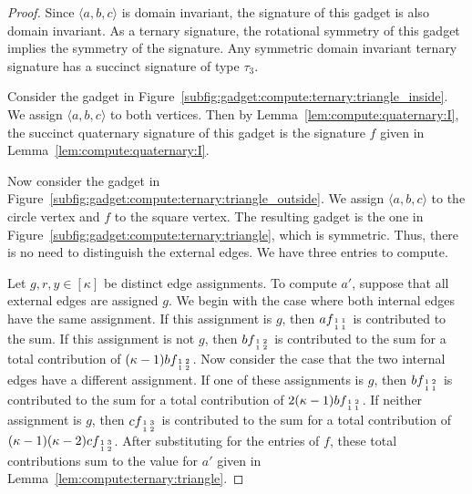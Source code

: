 \documentclass[11pt]{article}
\newcommand{\subMat}[4]{\mbox{\scriptsize $\begin{smallmatrix} #1 & #4 \\ #2 & #3 \end{smallmatrix}$}}
\begin{document}
\begin{proof}
 Since $\langle a,b,c \rangle$ is domain invariant,
 the signature of this gadget is also domain invariant.
 As a ternary signature,
 the rotational symmetry of this gadget implies the symmetry of the signature.
 Any symmetric domain invariant ternary signature has a succinct signature of type $\tau_3$.
 
 Consider the gadget in Figure~\ref{subfig:gadget:compute:ternary:triangle_inside}.
 We assign $\langle a,b,c \rangle$ to both vertices.
 Then by Lemma~\ref{lem:compute:quaternary:I},
 the succinct quaternary signature of this gadget is the signature $f$ given in Lemma~\ref{lem:compute:quaternary:I}.

 Now consider the gadget in Figure~\ref{subfig:gadget:compute:ternary:triangle_outside}.
 We assign $\langle a,b,c \rangle$ to the circle vertex and $f$ to the square vertex.
 The resulting gadget is the one in Figure~\ref{subfig:gadget:compute:ternary:triangle},
 which is symmetric.
 Thus, there is no need to distinguish the external edges.
 We have three entries to compute.
 
 Let $g,r,y \in [\kappa]$ be distinct edge assignments.
 To compute $a'$,
 suppose that all external edges are assigned $g$.
 We begin with the case where both internal edges have the same assignment.
 If this assignment is $g$,
 then $a f_{\subMat{1}{1}{1}{1}}$ is contributed to the sum.
 If this assignment is not $g$,
 then $b f_{\subMat{1}{1}{2}{2}}$ is contributed to the sum
 for a total contribution of $(\kappa - 1) b f_{\subMat{1}{1}{2}{2}}$.
 Now consider the case that the two internal edges have a different assignment.
 If one of these assignments is $g$,
 then $b f_{\subMat{1}{1}{1}{2}}$ is contributed to the sum
 for a total contribution of $2 (\kappa - 1) b f_{\subMat{1}{1}{1}{2}}$.
 If neither assignment is $g$,
 then $c f_{\subMat{1}{1}{2}{3}}$ is contributed to the sum
 for a total contribution of $(\kappa - 1) (\kappa - 2) c f_{\subMat{1}{1}{2}{3}}$.
 After substituting for the entries of $f$,
 these total contributions sum to the value for $a'$ given in Lemma~\ref{lem:compute:ternary:triangle}.
 

\end{proof}
\end{document}
